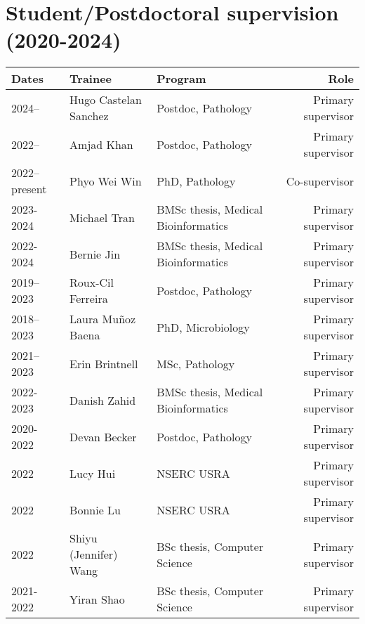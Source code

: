 
\section {Student/Postdoctoral supervision (2020-2024)}

\setlength{\tabcolsep}{6pt}
\begin{tabular}{llp{2.5in}r}
Dates & Trainee & Program & Role\\
\hline

2024-- & Hugo Castelan Sanchez & Postdoc, Pathology & Primary supervisor\\

2022-- & Amjad Khan & Postdoc, Pathology & Primary supervisor\\

2022--present & Phyo Wei Win & PhD, Pathology & Co-supervisor\\

2023-2024 & Michael Tran & BMSc thesis, Medical Bioinformatics & Primary supervisor\\

2022-2024 & Bernie Jin & BMSc thesis, Medical Bioinformatics & Primary supervisor\\

2019--2023 & Roux-Cil Ferreira & Postdoc, Pathology & Primary supervisor\\

2018--2023 & Laura Mu\~noz Baena & PhD, Microbiology & Primary supervisor\\

2021--2023 & Erin Brintnell & MSc, Pathology & Primary supervisor\\

2022-2023 & Danish Zahid & BMSc thesis, Medical Bioinformatics & Primary supervisor\\

2020-2022 & Devan Becker & Postdoc, Pathology & Primary supervisor\\

2022 & Lucy Hui & NSERC USRA & Primary supervisor\\

2022 & Bonnie Lu & NSERC USRA & Primary supervisor\\

2022 & Shiyu (Jennifer) Wang & BSc thesis, Computer Science & Primary supervisor\\

2021-2022 & Yiran Shao & BSc thesis, Computer Science & Primary supervisor\\



\end{tabular}
